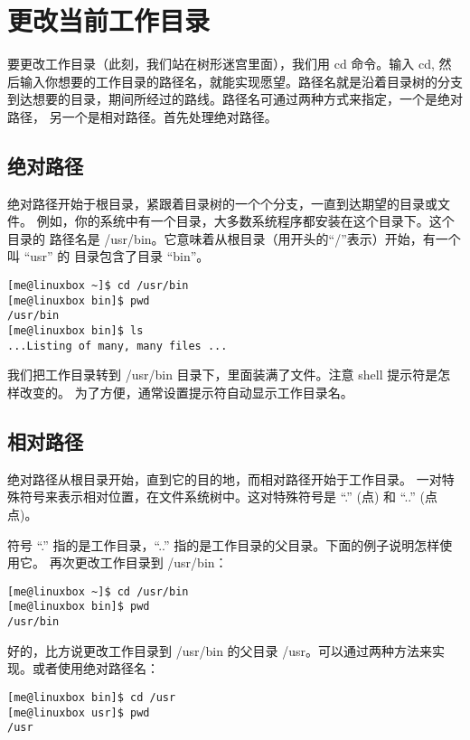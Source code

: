 \section{更改当前工作目录} %
\label{sec:更改当前工作目录}
\par 要更改工作目录（此刻，我们站在树形迷宫里面），我们用 cd 命令。输入 cd, 然后输入你想要的工作目录的路径名，就能实现愿望。路径名就是沿着目录树的分支 到达想要的目录，期间所经过的路线。路径名可通过两种方式来指定，一个是绝对路径， 另一个是相对路径。首先处理绝对路径。

\subsection{绝对路径} %
\label{ssub:绝对路径}
绝对路径开始于根目录，紧跟着目录树的一个个分支，一直到达期望的目录或文件。 例如，你的系统中有一个目录，大多数系统程序都安装在这个目录下。这个目录的 路径名是 /usr/bin。它意味着从根目录（用开头的“/”表示）开始，有一个叫 “usr” 的 目录包含了目录 “bin”。
\begin{lstlisting}
[me@linuxbox ~]$ cd /usr/bin
[me@linuxbox bin]$ pwd
/usr/bin
[me@linuxbox bin]$ ls
...Listing of many, many files ...
\end{lstlisting}
\par 我们把工作目录转到 /usr/bin 目录下，里面装满了文件。注意 shell 提示符是怎样改变的。 为了方便，通常设置提示符自动显示工作目录名。

\subsection{相对路径} %
\label{sub:相对路径}
绝对路径从根目录开始，直到它的目的地，而相对路径开始于工作目录。 一对特殊符号来表示相对位置，在文件系统树中。这对特殊符号是 ``.'' (点) 和 ``..'' (点点)。

\par 符号 ``.'' 指的是工作目录，``..'' 指的是工作目录的父目录。下面的例子说明怎样使用它。 再次更改工作目录到 /usr/bin：
\begin{lstlisting}
[me@linuxbox ~]$ cd /usr/bin
[me@linuxbox bin]$ pwd
/usr/bin
\end{lstlisting}

\par 好的，比方说更改工作目录到 /usr/bin 的父目录 /usr。可以通过两种方法来实现。或者使用绝对路径名：

\begin{lstlisting}
[me@linuxbox bin]$ cd /usr
[me@linuxbox usr]$ pwd
/usr
\end{lstlisting}


